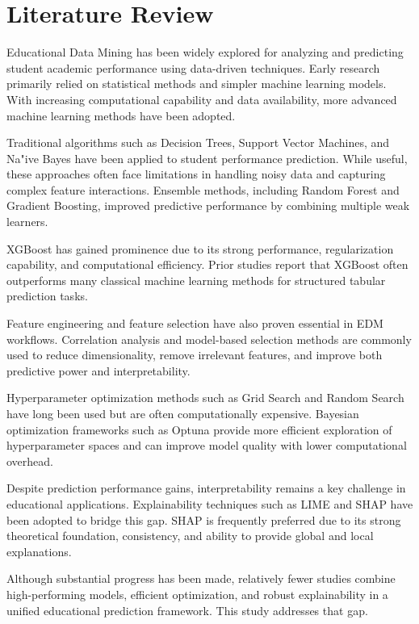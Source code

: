 \documentclass[12pt,a4paper]{article}
\begin{document}
\section{Literature Review}
Educational Data Mining has been widely explored for analyzing and predicting student academic performance using data-driven techniques. Early research primarily relied on statistical methods and simpler machine learning models. With increasing computational capability and data availability, more advanced machine learning methods have been adopted.

Traditional algorithms such as Decision Trees, Support Vector Machines, and Na"{i}ve Bayes have been applied to student performance prediction. While useful, these approaches often face limitations in handling noisy data and capturing complex feature interactions. Ensemble methods, including Random Forest and Gradient Boosting, improved predictive performance by combining multiple weak learners.

XGBoost has gained prominence due to its strong performance, regularization capability, and computational efficiency. Prior studies report that XGBoost often outperforms many classical machine learning methods for structured tabular prediction tasks.

Feature engineering and feature selection have also proven essential in EDM workflows. Correlation analysis and model-based selection methods are commonly used to reduce dimensionality, remove irrelevant features, and improve both predictive power and interpretability.

Hyperparameter optimization methods such as Grid Search and Random Search have long been used but are often computationally expensive. Bayesian optimization frameworks such as Optuna provide more efficient exploration of hyperparameter spaces and can improve model quality with lower computational overhead.

Despite prediction performance gains, interpretability remains a key challenge in educational applications. Explainability techniques such as LIME and SHAP have been adopted to bridge this gap. SHAP is frequently preferred due to its strong theoretical foundation, consistency, and ability to provide global and local explanations.

Although substantial progress has been made, relatively fewer studies combine high-performing models, efficient optimization, and robust explainability in a unified educational prediction framework. This study addresses that gap.
\end{document}
